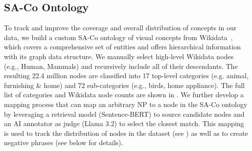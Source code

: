 \documentclass[]{fairmeta}
\newcommand{\eg}{e.g., }
\newcommand{\dsname}{{SA-Co}\xspace}
\begin{document}
\subsection{\dsname Ontology}
\label{sec:d2_ontology}
To track and improve the coverage and overall distribution of concepts in our data, we build a custom \dsname ontology of visual concepts from Wikidata~\citep{wikidata}, which covers a comprehensive set of entities and offers hierarchical information with its graph data structure. We manually select high-level Wikidata nodes (\eg Human, Mammals) and recursively include all of their descendants.  The resulting 22.4 million nodes are classified into 17 top-level categories (e.g. animal, furnishing \& home) and 72 sub-categories (\eg birds, home appliance). The full list of categories and Wikidata node counts are shown in .  We further develop a mapping process that can map an arbitrary NP to a node in the \dsname ontology by leveraging a retrieval model (Sentence-BERT) to source candidate nodes and an AI annotator as judge (Llama 3.2) to select the closest match. This mapping is used to track the distribution of nodes in the dataset (see ) as well as to create negative phrases (see below for details).
\end{document}

